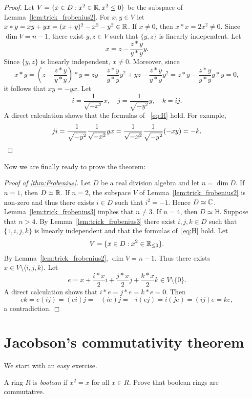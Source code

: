 \begin{proof}
	Let $V=\{x\in D:x^2\in\mathbb{R},x^2\leq 0\}$ be the subspace of Lemma~\ref{lem:trick_frobenius2}. 
	For $x,y\in V$ let $x*
	y=xy+yx=(x+y)^2-x^2-y^2\in\mathbb{R}$. If $x\ne0$, then $x*
	x=2x^2\ne0$. Since $\dim V=n-1$, there exist $y,z\in V$ such that $\{y,z\}$ is 
	linearly independent. Let 
	\[
		x=z-\frac{z* y}{y* y}y.
	\]
	Since $\{y,z\}$ is linearly independent, $x\ne0$. Moreover, since 
	\[
		x* y
		=\left(z-\frac{z* y}{y* y}\right)* y
		=zy-\frac{z* y}{y* y}y^2+yz-\frac{z* y}{y* y}y^2
		=z* y-\frac{z* y}{y* y}y* y=0,
	\]
	it follows that $xy=-yx$. 
	Let  
	\[
		i=\frac{1}{\sqrt{-x^2}}x,
		\quad
		j=\frac{1}{\sqrt{-y^2}}y,
		\quad
		k=ij. 
	\]
	A direct calculation shows that the formulas of ~\eqref{eq:H} hold. For example, 
	\[
		ji=\frac{1}{\sqrt{-y^2}}\frac{1}{\sqrt{-x^2}}yx=\frac{1}{\sqrt{-x^2}}\frac{1}{\sqrt{-y^2}}(-xy)=-k.\qedhere
	\]
\end{proof}

Now we are finally 
ready to prove the theorem: 

\begin{proof}[Proof of \ref{thm:Frobenius}]
	Let $D$ be a real division algebra and let $n=\dim D$. If $n=1$, then 
	$D\simeq\mathbb{R}$. If $n=2$, the subspace $V$ of Lemma~\ref{lem:trick_frobenius2} 
	is non-zero and thus there exists $i\in D$ such that 
	$i^2=-1$. Hence $D\simeq\mathbb{C}$. Lemma~\ref{lem:trick_frobenius3}
	implies that $n\ne3$. If $n=4$, then $D\simeq\mathbb{H}$. Suppose that 
	$n>4$.  By Lemma~\ref{lem:trick_frobenius3} there exist
	$i,j,k\in D$ such that $\{1,i,j,k\}$ is linearly independent 
	and that the formulas of~\eqref{eq:H} hold. Let 
	\[
		V=\{x\in D:x^2\in\mathbb{R}_{\leq0}\}.
	\]
	By Lemma~\ref{lem:trick_frobenius2}, $\dim V=n-1$. Thus there exists 
	$x\in V\setminus\langle i,j,k\rangle$. Let 
	\[
		e=x+\frac{i* x}{2}i+\frac{j* x}{2}j+\frac{k* x}{2}k\in V\setminus\{0\}.
	\]
	A direct calculation shows that $i* e=j* e=k* e=0$. Then 
	\[
		ek=e(ij)=(ei)j=-(ie)j=-i(ej)=i(je)=(ij)e=ke,
	\]
	a contradiction. 
\end{proof}

\section{Jacobson's commutativity theorem}

We start with an easy exercise. 

\begin{exercise}
    \label{xca:x^2=x}
    A ring $R$ is \emph{boolean} if $x^2=x$ for all $x\in R$. 
    Prove that boolean rings are commutative. 
\end{exercise}

